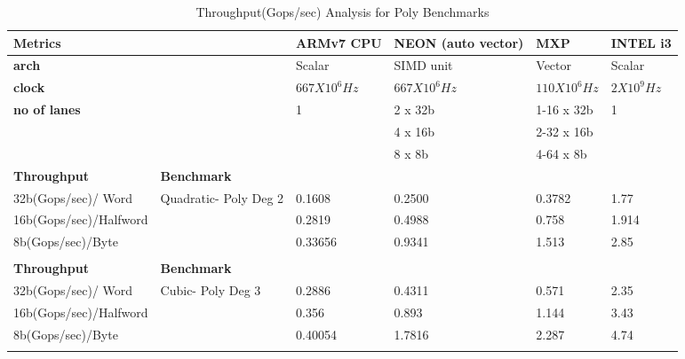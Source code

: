 \begin{table}[htbp]
	\centering
	\begin{adjustbox}{width=.9\textwidth}
		\small
		\begin{tabular}{llllll}
			\toprule
			\textbf{Metrics} &   & \textbf{ARMv7 CPU} & \textbf{NEON (auto vector)} & \textbf{MXP} & \textbf{INTEL i3} \\
			\midrule
			\textbf{arch} &   & Scalar & SIMD unit & Vector & Scalar \\
			\textbf{clock} &   & $667 X 10^{6}Hz$ & $667 X 10^{6}Hz$ & $110 X 10^{6}Hz$ & $2 X 10^{9}Hz$ \\
			\textbf{no of lanes} &   & 1 & 2 x 32b & 1-16 x 32b & 1 \\
			&   &   & 4 x 16b & 2-32 x 16b &  \\
			&   &   & 8 x 8b & 4-64 x 8b &  \\
			\midrule
			 \textbf{Throughput} & \textbf{Benchmark} &   &   &   &  \\
			\midrule
			 32b(Gops/sec)/ Word   & Quadratic- Poly Deg 2  & 0.1608  & 0.2500 & 0.3782 & 1.77 \\
			 16b(Gops/sec)/Halfword &   & 0.2819 & 0.4988 & 0.758 & 1.914\\
			 8b(Gops/sec)/Byte &   & 0.33656 & 0.9341 & 1.513 & 2.85 \\
			   &   &   &   &   &  \\
			\midrule
			 \textbf{Throughput} & \textbf{Benchmark} &   &   &   &  \\
			\midrule
			 32b(Gops/sec)/ Word   & Cubic- Poly Deg 3    & 0.2886 & 0.4311 & 0.571 & 2.35 \\
			 16b(Gops/sec)/Halfword &   & 0.356 & 0.893 & 1.144 & 3.43 \\
			 8b(Gops/sec)/Byte &   & 0.40054 & 1.7816 & 2.287 & 4.74 \\
			   &   &   &   &   &  \\
			\bottomrule
		\end{tabular}%
	\end{adjustbox}%
	\caption{Throughput(Gops/sec) Analysis for Poly Benchmarks}
	\label{poly:c}%
\end{table}%
